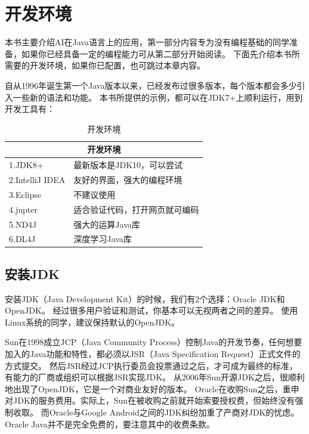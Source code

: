 \chapter{开发环境}
\label{chap:java_dev_environment}

本书主要介绍\gls{AI}在Java语言上的应用，第一部分内容专为没有编程基础的同学准备，如果你已经具备一定的编程能力可从第二部分开始阅读。
下面先介绍本书所需要的开发环境，如果你已配置，也可跳过本章内容。

自从1996年诞生第一个Java版本以来，已经发布过很多版本，每个版本都会多少引入一些新的语法和功能。
本书所提供的示例，都可以在JDK7+上顺利运行，用到开发工具有：

\begin{table}[!htbp]\centering
\small
\begin{tabular}{|p{4cm}|p{8cm}|}
\hline
\multicolumn{2}{|c|}{开发环境}\\
\hline
1.JDK8+&最新版本是JDK10，可以尝试\\
\hline
2.IntelliJ IDEA&友好的界面，强大的编程环境\\
\hline
3.Eclipse&不建议使用\\
\hline
4.jupter&适合验证代码，打开网页就可编码\\
\hline
5.ND4J&强大的运算Java库\\
\hline
6.DL4J&深度学习Java库\\
\hline
\end{tabular}
\caption{开发环境}
\label{tab:part1_dev_env}
\end{table}

\section{安装JDK}
安装JDK（Java Development Kit）的时候，我们有2个选择：Oracle JDK和OpenJDK。
经过很多用户验证和测试，你基本可以无视两者之间的差异。
使用Linux系统的同学，建议保持默认的OpenJDK。

Sun在1998成立JCP（Java Community Process）控制Java的开发节奏，任何想要加入的Java功能和特性，都必须以JSR（Java Specification Request）正式文件的方式提交。
然后JSR经过JCP执行委员会投票通过之后，才可成为最终的标准，有能力的厂商或组织可以根据JSR实现JDK。
从2006年Sun开源JDK之后，很顺利地出现了OpenJDK，它是一个对商业友好的版本。
Oracle在收购Sun之后，重申对JDK的服务费用。实际上，Sun在被收购之前就开始索要授权费，但始终没有强制收取。
而Oracle与Google Android之间的JDK纠纷加重了产商对JDK的忧虑。
Oracle Java并不是完全免费的，要注意其中的收费条款。

